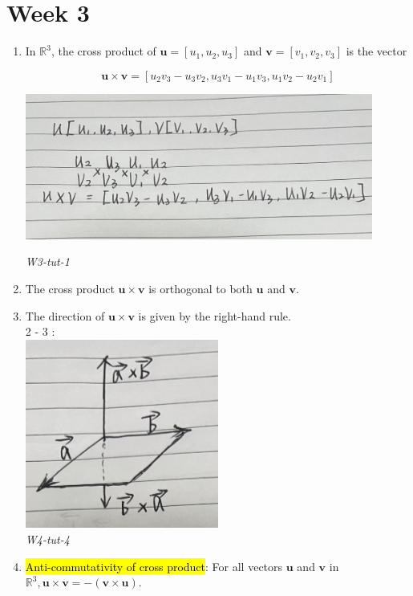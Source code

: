 \documentclass[10pt]{article}
\begin{document}
\section{Week 3}
\begin{enumerate}
\item  In $\mathbb{R}^{3}$, the cross product of $\mathbf{u}=\left[u_{1}, u_{2}, u_{3}\right]$ and $\mathbf{v}=\left[v_{1}, v_{2}, v_{3}\right]$ is the vector

$$
\mathbf{u} \times \mathbf{v}=\left[u_{2} v_{3}-u_{3} v_{2}, u_{3} v_{1}-u_{1} v_{3}, u_{1} v_{2}-u_{2} v_{1}\right]
$$

\includegraphics[width=0.9\textwidth]{images/w3-1.jpeg}

\textit{W3-tut-1}

\item  The cross product $\mathbf{u} \times \mathbf{v}$ is orthogonal to both $\mathbf{u}$ and $\mathbf{v}$.

\item  The direction of $\mathbf{u} \times \mathbf{v}$ is given by the right-hand rule.\\

2 - 3 :\\
\includegraphics[width=0.5\textwidth]{images/w3-2.jpeg}\\
\textit{W4-tut-4}


\item  \hl{Anti-commutativity of cross product}: For all vectors $\mathbf{u}$ and $\mathbf{v}$ in $\mathbb{R}^{3}, \mathbf{u} \times \mathbf{v}=-(\mathbf{v} \times \mathbf{u})$.


\end{enumerate}
\end{document}
